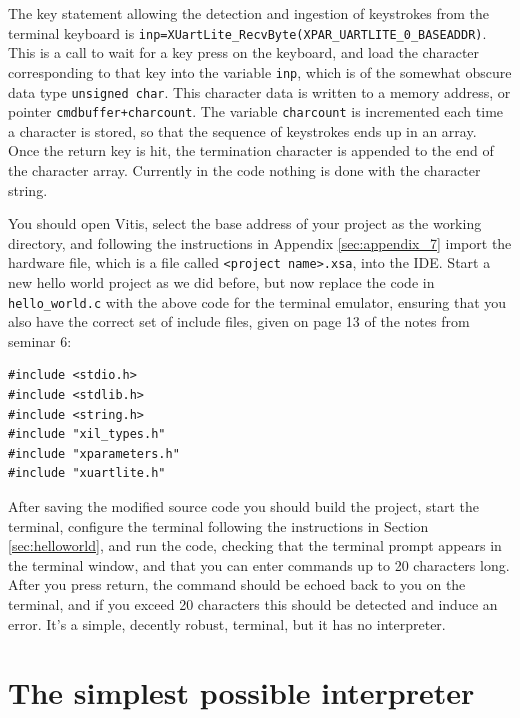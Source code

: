 \documentclass[../physical_computing.tex]{subfiles}
\begin{document}
The key statement allowing the detection and ingestion of keystrokes from the terminal keyboard is
\texttt{inp=XUartLite\_RecvByte(XPAR\_UARTLITE\_0\_BASEADDR)}. This is a call to wait for a key press
on the keyboard, and load the character corresponding to that key into the variable \texttt{inp}, which
is of the somewhat obscure data type \texttt{unsigned char}. This character data is written to a 
memory address, or pointer \texttt{cmdbuffer+charcount}. The variable \texttt{charcount} is incremented
each time a character is stored, so that the sequence of keystrokes ends up in an array. Once the
return key is hit, the termination character is appended to the end of the character array.
Currently in the code nothing is done with the character string.

You should open Vitis, select the base address of your project as the working directory, and following the 
instructions in Appendix \ref{sec:appendix_7} import the hardware file, which is a file called
\texttt{<project name>.xsa}, into the IDE. Start a new hello world project as we did before, but now replace
the code in \texttt{hello\_world.c} with the above code for the terminal emulator, ensuring that you also 
have the correct set of include files, given on page 13 of the notes from seminar 6:

\begin{verbatim}
#include <stdio.h>
#include <stdlib.h>
#include <string.h>
#include "xil_types.h"
#include "xparameters.h"
#include "xuartlite.h"
\end{verbatim}

After saving the modified source code you should build the project, start the terminal, configure the terminal
following the instructions in Section \ref{sec:helloworld}, and run the code, checking that the terminal prompt
appears in the terminal window, and that you can enter commands up to 20 characters long. After you press return, 
the command should be echoed back to you on the terminal, and if you exceed 20 characters this should be detected
and induce an error. It's a simple, decently robust, terminal, but it has no interpreter.

\section{The simplest possible interpreter}
\label{sec:simpleinterpreter}
\end{document}
